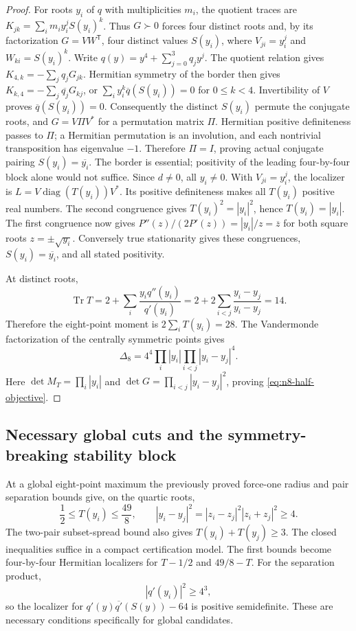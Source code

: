 \documentclass[11pt]{article}
\theoremstyle{remark}
\numberwithin{equation}{section}
\begin{document}
\begin{proof}
For roots $y_i$ of $q$ with multiplicities $m_i$, the quotient traces
are $K_{jk}=\sum_i m_i y_i^jS(y_i)^k$. Thus $G\succ0$ forces four
distinct roots and, by its factorization $G=VW^{\mathsf T}$, four
distinct values $S(y_i)$, where $V_{ji}=y_i^j$ and
$W_{ki}=S(y_i)^k$. Write $q(y)=y^4+\sum_{j=0}^3q_jy^j$.
The quotient relation gives $K_{4,k}=-\sum_jq_jG_{jk}$.
Hermitian symmetry of the border then gives
$K_{k,4}=-\sum_j\overline{q_j}G_{kj}$, or
$\sum_i y_i^k\overline q(S(y_i))=0$ for $0\le k<4$.
Invertibility of $V$ proves $\overline q(S(y_i))=0$.
Consequently the distinct $S(y_i)$ permute the conjugate roots, and
$G=V\Pi V^*$ for a permutation matrix $\Pi$. Hermitian positive
definiteness passes to $\Pi$; a Hermitian permutation is an involution,
and each nontrivial transposition has eigenvalue $-1$. Therefore
$\Pi=I$, proving actual conjugate pairing
$S(y_i)=\overline{y_i}$. The border is essential; positivity of the
leading four-by-four block alone would not suffice. Since $d\ne0$,
all $y_i\ne0$.
With $V_{ji}=y_i^j$, the localizer is
$L=V\operatorname{diag}(T(y_i))V^*$. Its positive definiteness makes
all $T(y_i)$ positive real numbers. The second congruence gives
$T(y_i)^2=|y_i|^2$, hence $T(y_i)=|y_i|$.
The first congruence now gives
$P''(z)/(2P'(z))=|y_i|/z=\overline z$ for both square roots
$z=\pm\sqrt{y_i}$. Conversely true stationarity gives these
congruences, $S(y_i)=\overline{y_i}$, and all stated positivity.

At distinct roots,
\[
 \operatorname{Tr}T
 =2+\sum_i\frac{y_iq''(y_i)}{q'(y_i)}
 =2+2\sum_{i<j}\frac{y_i-y_j}{y_i-y_j}=14.
\]
Therefore the eight-point moment is $2\sum_iT(y_i)=28$.
The Vandermonde factorization of the centrally symmetric points gives
\[
 \Delta_8=4^4\prod_i|y_i|\prod_{i<j}|y_i-y_j|^4.
\]
Here $\det M_T=\prod_i|y_i|$ and
$\det G=\prod_{i<j}|y_i-y_j|^2$, proving
\eqref{eq:n8-half-objective}.
\end{proof}

\subsection{Necessary global cuts and the symmetry-breaking stability block}
At a global eight-point maximum the previously proved force-one
radius and pair separation bounds give, on the quartic roots,
\[
 \frac12\le T(y_i)\le\frac{49}8,\qquad
 |y_i-y_j|^2=|z_i-z_j|^2|z_i+z_j|^2\ge4.
\]
The two-pair subset-spread bound also gives
$T(y_i)+T(y_j)\ge3$. The closed inequalities suffice in a compact
certification model. The first bounds become four-by-four Hermitian
localizers for $T-1/2$ and $49/8-T$. For the separation product,
\[
 |q'(y_i)|^2\ge4^3,
\]
so the localizer for
$q'(y)\overline{q'}(S(y))-64$ is positive semidefinite.
These are necessary conditions specifically for global candidates.
\end{document}
